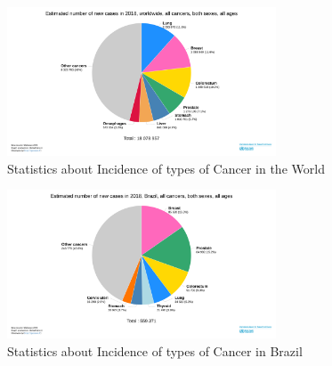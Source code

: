 \documentclass[conference]{IEEEtran}
\begin{document}
\begin{figure}[h]
    \centering
    \includegraphics[width=8cm]{Figuras/graphic1.png}
    \caption{Statistics about Incidence of types of Cancer in the World \cite{GLOBOCAN}}
    \label{fig:my_label}
\end{figure}

\begin{figure}[h]
    \centering
    \includegraphics[width=8cm]{Figuras/graphic2.png}
    \caption{Statistics about Incidence of types of Cancer in Brazil \cite{GLOBOCAN}}
    \label{fig:my_label}
\end{figure}
\end{document}
